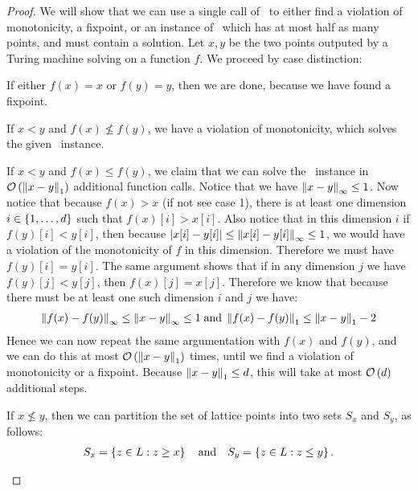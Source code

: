 \begin{proof}
    We will show that we can use a single call of \Tarskistar\ to either find a violation of monotonicity, a fixpoint, or an instance of \Tarski\ which has at most half as many points, and must contain a solution. Let $x, y$ be the two points outputed by a Turing machine solving \Tarskistar on a function $f$. We proceed by case distinction:
    \begin{case}{1}
        If either $f(x) = x$ or $f(y) = y$, then we are done, because we have found a fixpoint.
    \end{case}
    \begin{case}{2.1}
        If $x < y$ and $f(x) \not\leq f(y)$, we have a violation of monotonicity, which solves the given \Tarski\ instance.
    \end{case}
    \begin{case}{2.2}
        If $x < y$ and $f(x) \leq f(y)$, we claim that we can solve the \Tarski\ instance in $\mathcal{O}\left(\left\lVert x - y\right\rVert_{1}\right)$ additional function calls. Notice that we have $\left\lVert x-y\right\rVert_{\infty} \leq 1$. Now notice that because $f(x) > x$ (if not see case 1), there is at least one dimension $i \in \left\{1, \dots, d\right\}$ such that $f(x)[i] > x[i]$. Also notice that in this dimension $i$ if $f(y)[i] < y[i]$, then because $\left\lvert x[i] - y[i]\right\rvert \leq \left\lVert x[i] - y[i]\right\rVert_{\infty} \leq 1$, we would have a violation of the monotonicity of $f$ in this dimension. Therefore we must have $f(y)[i] = y[i]$. The same argument shows that if in any dimension $j$ we have $f(y)[j] < y[j]$, then $f(x)[j] = x[j]$. Therefore we know that because there must be at least one such dimension $i$ and $j$ we have:
        \begin{align*}
            \left\lVert f(x) - f(y)\right\rVert_{\infty} \leq \left\lVert x - y\right\rVert_{\infty} \leq 1 \; \text{and} \; \left\lVert f(x) - f(y)\right\rVert_{1} \leq \left\lVert x - y\right\rVert_{1} - 2
        \end{align*}
        Hence we can now repeat the same argumentation with $f(x)$ and $f(y)$, and we can do this at most $\mathcal{O}\left(\left\lVert x - y\right\rVert_{1}\right)$ times, until we find a violation of monotonicity or a fixpoint. Because $\left\lVert x - y\right\rVert_{1} \leq d$, this will take at most $\mathcal{O}\left(d\right)$ additional steps.
    \end{case}
    \begin{case}{3}
        If $x \not\leq y$, then we can partition the set of lattice points into two sets $S_x$ and $S_y$, as follows:
        \begin{align*}
            S_x = \set{z \in L : z \geq x} \quad \text{and} \quad S_y = \set{z \in L : z \leq y}.

\end{align*}
\end{case}
\end{proof}
